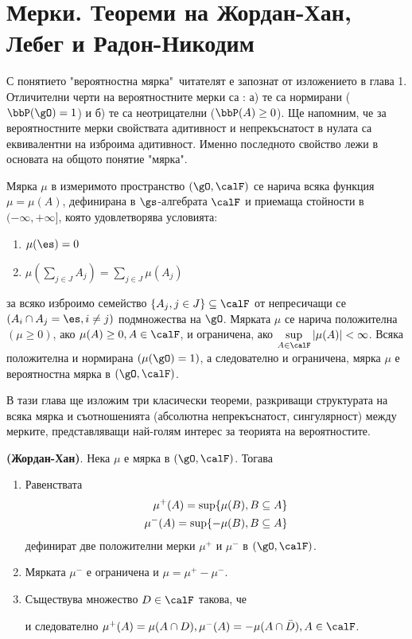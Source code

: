 \chapter[Мерки. Теореми на Жордан-Хан, Лебег и Радон-Никодим]
{Мерки. Теореми на Жордан-Хан,\\ Лебег и Радон-Никодим}\label{ch:4}

С понятието "вероятностна мярка"\, читателят е запознат от изложението в глава 1.
Отличителни черти на вероятностните мерки са : а) те са нормирани ($\bbP (\gO)=1$)
и б) те са неотрицателни ($\bbP(A)\geq 0$). Ще напомним, че за вероятностните
мерки свойствата адитивност и непрекъснатост в нулата са еквивалентни на изброима
адитивност. Именно последното свойство лежи в основата на общото понятие "мярка".
\begin{dfn}\label{dfn:4.1}
Мярка $\mu$ в измеримото пространство $(\gO,\calF)$ се
нарича всяка функция $\mu = \mu(A)$, дефинирана в $\gs$-алгебрата $\calF$ и
приемаща стойности в $(-\infty,+\infty]$, която удовлетворява условията:
\begin{enumerate}
\item $\mu(\es) = 0$
\item $\mu(\sum\limits_{j \in J}A_{j}) = \sum\limits_{j\in J}\mu(A_j)$
\end{enumerate}
за всяко изброимо семейство $\{A_{j},j \in J\}\subseteq \calF$ от непресичащи се
$(A_{i} \cap A_{j} = \es, i \neq j)$ подмножества на $\gO$. Мярката $\mu$ се 
нарича положителна $(\mu\geq0)$, ако $\mu(A)\geq 0,
A\in\calF$, и ограничена, ако $\sup\limits_{A \in \calF}|\mu(A)|<\infty$. Всяка
положителна и нормирана $(\mu(\gO) = 1)$, а следователно и ограничена, мярка
$\mu$ е вероятностна мярка в $(\gO,\calF)$.
\end{dfn}
В тази глава ще изложим три класически теореми, разкриващи структурата на всяка
мярка и съотношенията (абсолютна непрекъснатост, сингулярност) между мерките,
представляващи най-голям интерес за теорията на вероятностите.
\begin{thm}\label{thm:4.1} \textbf{(Жордан-Хан)}. Нека $\mu$ е мярка в
$(\gO,\calF)$. Тогава
\begin{enumerate}
\item Равенствата
\begin{align}
\mu^{+}(A) = \sup\{\mu(B),B\subseteq A\}\notag\\
\mu^{-}(A) = \sup\{-\mu(B),B\subseteq A\}\notag
\end{align}
дефинират две положителни мерки $\mu^{+}$ и $\mu^{-}$ в $(\gO,\calF)$.
\item Мярката $\mu^{-}$ е ограничена и $\mu = \mu^{+} - \mu^{-}$.
\item Съществува множество $D \in \calF$ такова, че
и следователно $\mu^{+}(A) = \mu(A \cap D), \mu^{-}(A) = - \mu(A \cap
\bar{D}), A \in \calF$.
\end{enumerate}
\end{thm}
